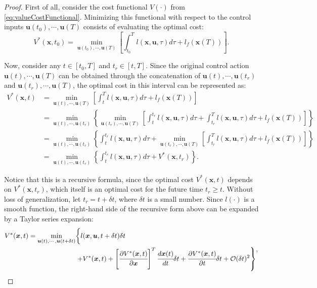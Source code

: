 \documentclass[a4paper,11pt]{book}
\numberwithin{figure}{chapter}
\numberwithin{equation}{chapter}
\numberwithin{table}{chapter}
\theoremstyle{definition}
\begin{document}
\begin{proof}
    First of all, consider the cost functional $V(\cdot)$ from \eqref{eq:valueCostFunctional}. Minimizing this functional with respect to the control inputs $\bm{u}(t_0), \cdots, \bm{u}(T)$ consists of evaluating the optimal cost:
    \begin{equation}
        V^*(\bm{x}, t_0) = \min_{\bm{u}(t_0), \cdots, \bm{u}(T)} \left[ \int_{t_0}^T l(\bm{x}, \bm{u}, \tau) d \tau + l_f(\bm{x}(T)) \right]
    .\end{equation}
    
    Now, consider any $t \in [t_0, T]$ and $t_r \in [t, T]$. Since the original control action $\bm{u}(t), \cdots, \bm{u}(T)$ can be obtained through the concatenation of $\bm{u}(t), \cdots, \bm{u}(t_r)$ and $\bm{u}(t_r), \cdots, \bm{u}(T)$, the optimal cost in this interval can be represented as:
    \begin{equation} \label{eq:HJERecursive}
    \begin{split}
    V^*(\bm{x}, t) &= \min_{\bm{u}(t), \cdots, \bm{u}(T)} \left[ \int_{t}^T l(\bm{x}, \bm{u}, \tau) d \tau + l_f(\bm{x}(T)) \right] \\
        &= \min_{\bm{u}(t), \cdots, \bm{u}(t_r)} \left\{ \min_{\bm{u}(t_r), \cdots, \bm{u}(T)} \left[ \int_{t}^{t_r} l(\bm{x}, \bm{u}, \tau) d \tau + \int_{t_r}^{T} l(\bm{x}, \bm{u}, \tau) d \tau + l_f(\bm{x}(T)) \right] \right\} \\
        &= \min_{\bm{u}(t), \cdots, \bm{u}(t_r)} \left\{ \int_{t}^{t_r} l(\bm{x}, \bm{u}, \tau) d \tau + \min_{\bm{u}(t_r), \cdots, \bm{u}(T)} \left[ \int_{t_r}^{T} l(\bm{x}, \bm{u}, \tau) d \tau + l_f(\bm{x}(T)) \right] \right\} \\
        &= \min_{\bm{u}(t), \cdots, \bm{u}(t_r)} \left\{ \int_{t}^{t_r} l(\bm{x}, \bm{u}, \tau) d \tau + V^*(\bm{x}, t_r) \right\}.
    \end{split}
    \end{equation}

	\noindent Notice that this is a recursive formula, since the optimal cost $V^*(\bm{x}, t)$ depends on $V^*(\bm{x}, t_r)$, which itself is an optimal cost for the future time $t_r \geq t$. Without loss of generalization, let $t_r = t + \delta t$, where $\delta t$ is a small number. Since $l(\cdot)$ is a smooth function, the right-hand side of the recursive form above can be expanded by a Taylor series expansion:
    \begin{equation}
    \begin{split}
        V^*(\bm{x}, t) = \min_{\bm{u}(t), \cdots, \bm{u}(t+\delta t)} & \biggl\{  l(\bm{x}, \bm{u}, t + \delta t) \delta t \biggr. \\ 
        & \left. + V^*(\bm{x}, t) + \left[ \cfrac{\partial V^*(\bm{x}, t)}{\partial \bm{x}} \right]^T \cfrac{d \bm{x}(t)}{dt} \delta t + \cfrac{\partial V^*(\bm{x}, t)}{\partial t} \delta t + \mathcal{O}(\delta t)^2  \right\}
    \end{split}
    ,\end{equation}
    

\end{proof}
\end{document}
